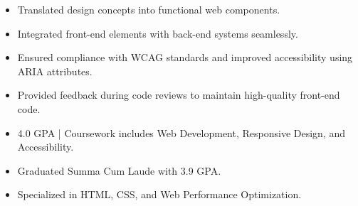 \par\smallskip
\noindent
\begin{minipage}{20cm}
  \begin{minipage}{9.75cm}
    \begin{itemize}
      \item Translated design concepts into functional web components.
      \item Integrated front-end elements with back-end systems seamlessly.
    \end{itemize}
  \end{minipage}
  \hfill
  \begin{minipage}{9.75cm}
    \begin{itemize}
      \item Ensured compliance with WCAG standards and improved accessibility using ARIA attributes.
      \item Provided feedback during code reviews to maintain high-quality front-end code.
    \end{itemize}
  \end{minipage}
\end{minipage}
\par\smallskip
\divider

\begin{itemize}
  \item 4.0 GPA | Coursework includes Web Development, Responsive Design, and Accessibility.
\end{itemize}
\divider

\begin{itemize}
  \item Graduated Summa Cum Laude with 3.9 GPA.
  \item Specialized in HTML, CSS, and Web Performance Optimization.
\end{itemize}

\noindent
\begin{minipage}{20cm}
\end{minipage}


